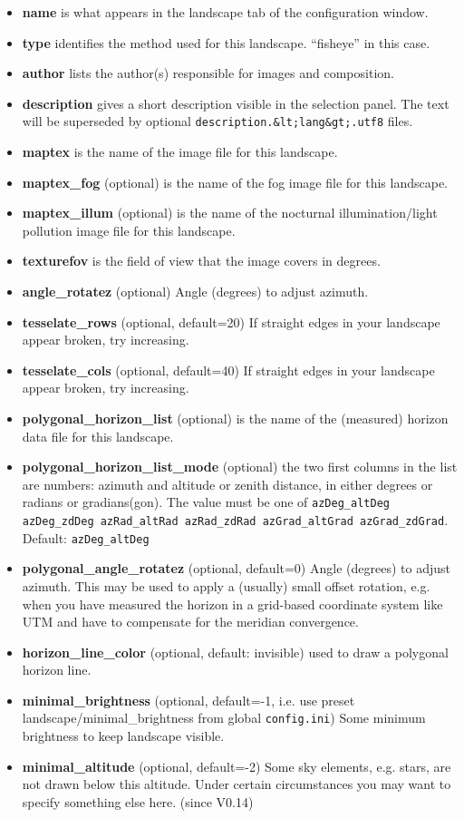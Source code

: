 \begin{itemize}
\item
  \textbf{name} is what appears in the landscape tab of the
  configuration window.
\item
  \textbf{type} identifies the method used for this landscape.
  ``fisheye'' in this case.
\item
  \textbf{author} lists the author(s) responsible for images and
  composition.
\item
  \textbf{description} gives a short description visible in the
  selection panel. The text will be superseded by optional
  \texttt{description.\&lt;lang\&gt;.utf8} files.
\item
  \textbf{maptex} is the name of the image file for this landscape.
\item
  \textbf{maptex\_fog} (optional) is the name of the fog image file for
  this landscape.
\item
  \textbf{maptex\_illum} (optional) is the name of the nocturnal
  illumination/light pollution image file for this landscape.
\item
  \textbf{texturefov} is the field of view that the image covers in
  degrees.
\item
  \textbf{angle\_rotatez} (optional) Angle (degrees) to adjust azimuth.
\item
  \textbf{tesselate\_rows} (optional, default=20) If straight edges in
  your landscape appear broken, try increasing.
\item
  \textbf{tesselate\_cols} (optional, default=40) If straight edges in
  your landscape appear broken, try increasing.
\item
  \textbf{polygonal\_horizon\_list} (optional) is the name of the
  (measured) horizon data file for this landscape.
\item
  \textbf{polygonal\_horizon\_list\_mode} (optional) the two first
  columns in the list are numbers: azimuth and altitude or zenith
  distance, in either degrees or radians or gradians(gon). The value
  must be one of
  \texttt{azDeg\_altDeg \textbar{} azDeg\_zdDeg \textbar{} azRad\_altRad \textbar{} azRad\_zdRad \textbar{} azGrad\_altGrad \textbar{} azGrad\_zdGrad}.
  Default: \texttt{azDeg\_altDeg}
\item
  \textbf{polygonal\_angle\_rotatez} (optional, default=0) Angle
  (degrees) to adjust azimuth. This may be used to apply a (usually)
  small offset rotation, e.g. when you have measured the horizon in a
  grid-based coordinate system like UTM and have to compensate for the
  meridian convergence.
\item
  \textbf{horizon\_line\_color} (optional, default: invisible) used to
  draw a polygonal horizon line.
\item
  \textbf{minimal\_brightness} (optional, default=-1, i.e. use preset
  landscape/minimal\_brightness from global \texttt{config.ini}) Some
  minimum brightness to keep landscape visible.
\item
  \textbf{minimal\_altitude} (optional, default=-2) Some sky elements,
  e.g. stars, are not drawn below this altitude. Under certain
  circumstances you may want to specify something else here. (since
  V0.14)
\end{itemize}

